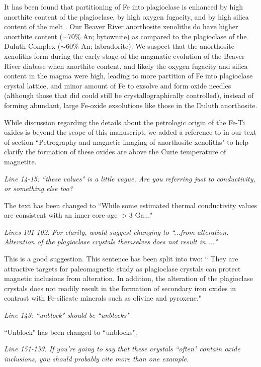 \documentclass[11pt, letterpaper]{article}
\begin{document}
\begin{flushleft}
It has been found that partitioning of Fe into plagioclase is enhanced by high anorthite content of the plagioclase, by high oxygen fugacity, and by high silica content of the melt \citep{Phinney1992a, Longhi1976a}. Our Beaver River anorthosite xenoliths do have higher anorthite content ($\sim$70\% An; bytownite) as compared to the plagioclase of the Duluth Complex ($\sim$60\% An; labradorite). We suspect that the anorthosite xenoliths form during the early stage of the magmatic evolution of the Beaver River diabase when anorthite content, and likely the oxygen fugacity and silica content in the magma were high, leading to more partition of Fe into plagioclase crystal lattice, and minor amount of Fe to exsolve and form oxide needles (although those that did could still be crystallographically controlled), instead of forming abundant, large Fe-oxide exsolutions like those in the Duluth anorthosite. 

While discussion regarding the details about the petrologic origin of the Fe-Ti oxides is beyond the scope of this manuscript, we added a reference to \cite{Bian2021a} in our text of section ``Petrography and magnetic imaging of anorthosite xenoliths" to help clarify the formation of these oxides are above the Curie temperature of magnetite.

\textit{Line 14-15: ``these values" is a little vague. Are you referring just to conductivity, or something else too?}

The text has been changed to ``While some estimated thermal conductivity values are consistent with an inner core age $>$3 Ga..."

\textit{Lines 101-102: For clarity, would suggest changing to ``...from alteration. Alteration of the plagioclase crystals themselves does not result in ..."}

This is a good suggestion. This sentence has been split into two: `` They are attractive targets for paleomagnetic study as plagioclase crystals can protect magnetic inclusions from alteration. In addition, the alteration of the plagioclase crystals does not readily result in the formation of secondary iron oxides in contrast with Fe-silicate minerals such as olivine and pyroxene."

\textit{Line 143: ``unblock" should be ``unblocks"}

``Unblock" has been changed to ``unblocks".

\textit{Line 151-153. If you're going to say that these crystals ``often" contain oxide inclusions, you should probably cite more than one example.}


\end{flushleft}
\end{document}

